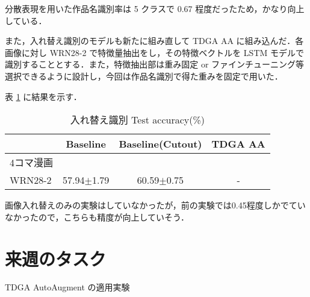 \documentclass[onecolumn]{ujarticle}   %
\begin{document}
  分散表現を用いた作品名識別率は 5 クラスで 0.67 程度だったため，かなり向上している．

  また，入れ替え識別のモデルも新たに組み直して TDGA AA に組み込んだ．各画像に対し WRN28-2 で特徴量抽出をし，その特徴ベクトルを LSTM モデルで識別することとする．また，特徴抽出部は重み固定 or ファインチューニング等選択できるように設計し，今回は作品名識別で得た重みを固定で用いた．

  表 \ref{tab:swap_experiments} に結果を示す．
  \begin{table}[ht]
		\centering
		\caption{入れ替え識別 Test accuracy(\%)}
		\label{tab:swap_experiments}
		\begin{tabular}{l||c c c} \hline
		  &Baseline&Baseline(Cutout)&TDGA AA\\ \hline
			4コマ漫画 &&&\\
      WRN28-2&57.94$\pm$1.79 &60.59$\pm$0.75&-\\
		\end{tabular}
	\end{table}

  画像入れ替えのみの実験はしていなかったが，前の実験では0.45程度しかでていなかったので，こちらも精度が向上していそう．

  \section{来週のタスク}
  TDGA AutoAugment の適用実験

\end{document}
